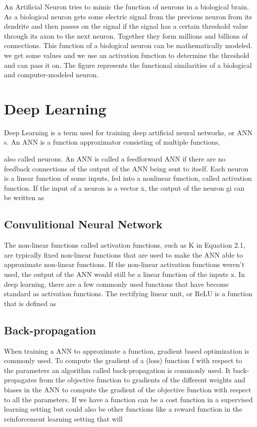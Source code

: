 An Artificial Neuron tries to mimic the function of neurons in a biological brain. As a biological neuron gets some electric signal from the previous neuron from its dendrite and then passes on the signal if the signal has a certain threshold value through its axon to the next neuron. Together they form millions and billions of connections.
This function of a biological neuron can be mathematically modeled. we get some values and we use an activation function to determine the threshold and can pass it on. The figure represents the functional similarities of a biological and computer-modeled neuron.









\section{Deep Learning}
Deep Learning is a term used for training deep artificial neural networks, or
ANN s. An ANN is a function approximator consisting of multiple functions,

also called neurons. An ANN is called a feedforward ANN if there are no
feedback connections of the output of the ANN being sent to itself. Each neuron
is a linear function of some inputs, fed into a nonlinear function, called activation
function. If the input of a neuron is a vector x, the output of the neuron gi can
be written as


\subsection{Convulitional Neural Network}
The non-linear functions called activation functions, such as K in Equation 2.1,
are typically fixed non-linear functions that are used to make the ANN able to
approximate non-linear functions. If the non-linear activation functions weren’t
used, the output of the ANN would still be a linear function of the inputs x. In deep learning, there are a few commonly used functions that
have become standard as activation functions.
The rectifying linear unit, or ReLU is a function that is defined as


\subsection{Back-propagation}
When training a ANN to approximate a function, gradient based optimization
is commonly used. To compute the gradient of a (loss) function f with
respect to the parameters  an algorithm called back-propagation is commonly
used. It back-propagates from the objective function to gradients of the different
weights and biases in the ANN to compute the gradient of the objective function with respect to all the parameters. If we have a function 
can be a cost function in a supervised learning setting but could also be other
functions like a reward function in the reinforcement learning setting that will

